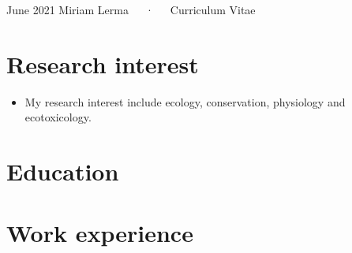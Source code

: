 \documentclass[11pt, a4paper]{awesome-cv}
\providecommand{\tightlist}{%
	\setlength{\itemsep}{0pt}\setlength{\parskip}{0pt}}
\begin{document}
\makecvheader

\makecvfooter
  {June 2021}
    {Miriam Lerma~~~·~~~Curriculum Vitae}
  {\thepage}





\hypertarget{research-interest}{%
\section{Research interest}\label{research-interest}}

\begin{itemize}
\tightlist
\item
  My research interest include ecology, conservation, physiology and
  ecotoxicology.
\end{itemize}

\hypertarget{education}{%
\section{Education}\label{education}}

\begin{cventries}
    \vspace{-4.0mm}
    \vspace{-4.0mm}
    \vspace{-4.0mm}
\end{cventries}

\hypertarget{work-experience}{%
\section{Work experience}\label{work-experience}}
\end{document}
